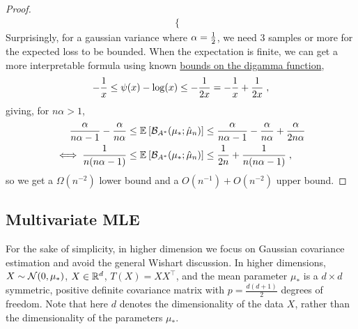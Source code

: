 \begin{proof}
\begin{align}
\begin{cases}
	\end{cases}
	\end{align}
	Surprisingly, for a gaussian variance where $\alpha = \frac{1}{2}$, we need $3$ samples or more for the expected loss to be bounded.
	When the expectation is finite, we can get a more interpretable formula using known \href{https://en.wikipedia.org/wiki/Digamma_function#Inequalities}{bounds on the digamma function},
	\begin{align}
		-\frac{1}{x} \leq \psi(x) - \log(x) \leq -\frac{1}{2x} = - \frac{1}{x} + \frac{1}{2x}	\; ,
	\end{align}
	giving, for $n \alpha >1 $,
	\begin{align}
		\frac{\alpha}{n\alpha-1} - \frac{\alpha}{n\alpha}
		&\leq \mathbb{E}_{} \left[ {\mathcal B}_{A^*}( \mu_*; \hat \mu_n)  \right] 
		\leq \frac{\alpha}{n\alpha-1} - \frac{\alpha}{n\alpha} + \frac{\alpha}{2n\alpha}
		\\
		\iff
			\frac{1}{n(n \alpha-1)}
			&\leq \mathbb{E}_{} \left[ {\mathcal B}_{A^*}( \mu_*; \hat \mu_n)  \right] 
			\leq \frac{1}{2n} + \frac{1}{n(n \alpha-1)} \; ,
	\end{align}
	so we get a $\Omega(n^{-2})$ lower bound and a $O(n^{-1}) + O(n^{-2})$ upper bound.
	\end{proof}


\subsection{Multivariate MLE}
\label{app:multivariateMLE}

For the sake of simplicity, in higher dimension we focus on Gaussian covariance estimation and avoid the general Wishart discussion. 
In higher dimensions, $X \sim {\mathcal N}(0, \mu_*)$, $X\in\mathbb{R}^d$, $T(X) = XX^\top$, and the mean parameter $\mu_*$ 
is a $d \times d$ symmetric, positive definite covariance matrix with $p = \frac{d(d+1)}{2}$ degrees of freedom.
Note that here $d$ denotes the dimensionality of the data $X$, rather than the dimensionality of the parameters $\mu_*$.

